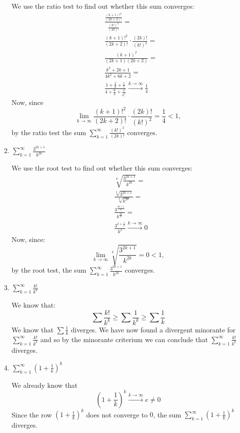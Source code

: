 \documentclass[week=6]{homework}
\begin{document}
\begin{questions}
\begin{enumerate}[label=(\alph*)]
		    We use the ratio test to find out whether this sum converges:
		    \begin{align*}
		    	& \frac{\frac{(k+1)!^2}{(2k+2)!}}{\frac{(k!)^2}{(2k)!}} = \\
		    	& \frac{(k+1)!^2}{(2k+2)!} \cdot \frac{(2k)!}{(k!)^2} = \\
		    	& \frac{(k+1)^2}{(2k+1)(2k+2)} = \\
		    	& \frac{k^2 + 2k + 1}{4k^2 + 6k + 2} = \\
		    	& \frac{1 + \frac{2}{k} + \frac{1}{^2}}{4 + \frac{6}{k} + \frac{2}{k^2}} \xrightarrow{k \to \infty} \frac{1}{4}
		    \end{align*}
		    Now, since 
		    \[
		    \lim_{k \to \infty} \frac{(k+1)!^2}{(2k+2)!} \cdot \frac{(2k)!}{(k!)^2} = \frac{1}{4} < 1,
		    \]
		    by the ratio test the sum $\sum_{k=1}^{\infty} \frac{(k!)^2}{(2k)!}$ converges. 
	    	
	    	\addtocounter{enumi}{2}
	    	\item $\displaystyle \sum_{k=1}^{\infty} \frac{3^{2k+1}}{k^{2k}}$
	    	
	    	We use the root test to find out whether this sum converges:
	    	\begin{align*}
	    		& \sqrt[k]{\frac{3^{2k+1}}{k^{2k}}} = \\
	    		& \frac{\sqrt[k]{3^{2k+1}}}{\sqrt[k]{k^{2k}}} = \\
	    		& \frac{3^{\frac{2k+1}{k}}}{k^{\frac{2k}{k}}} = \\
	    		& \frac{3^{2 + \frac{1}{k}}}{k^2} \xrightarrow{k \to \infty} 0
	    	\end{align*}
	    	Now, since:
	    	\[
		    	\lim_{k \to \infty} \sqrt[k]{\frac{3^{2k+1}}{k^{2k}}} = 0 < 1,
	    	\]
	    	by the root test, the sum $ \sum_{k=1}^{\infty} \frac{3^{2k+1}}{k^{2k}}$ converges. 
	    	
	    	\addtocounter{enumi}{1}
	    	\item $\displaystyle \sum_{k=1}^{\infty} \frac{k!}{k^k}$
	    	
	    	We know that:
	    	\[
		    	\sum \frac{k!}{k^k} \ge \sum \frac{1}{k^k} \ge \sum \frac{1}{k}
	    	\]
	    	We know that $\sum \frac{1}{k}$ diverges. We have now found a divergent minorante for $\sum_{k=1}^{\infty} \frac{k!}{k^k}$ and so by the minorante criterium we can conclude that $\sum_{k=1}^{\infty} \frac{k!}{k^k}$ diverges. 
	    	
	    	\addtocounter{enumi}{1}
	    	\item $\displaystyle \sum_{k=1}^{\infty} \left(1 + \frac{1}{k}\right)^k$
	    	
	    	We already know that
	    	\[
		    	\left(1 + \frac{1}{k}\right)^k \xrightarrow{k \to \infty} e \neq 0
	    	\]
	    	Since the row $\left(1 + \frac{1}{k}\right)^k$ does not converge to $0$, the sum $\sum_{k=1}^{\infty} \left(1 + \frac{1}{k}\right)^k$ diverges. 
	    \end{enumerate}
     \end{questions}
\end{document}
